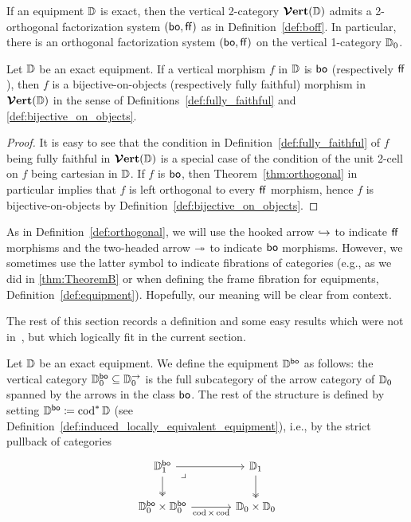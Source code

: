 \documentclass[11pt,oneside,article]{memoir}
\begin{document}
\begin{theorem}
      \label{thm:orthogonal}
   If an equipment $\mathbb{D}$ is exact, then the vertical 2-category $\bm{\mathcal{V}}\mathbf{ert}(\mathbb{D})$ admits a
   2-orthogonal factorization system $(\mathsf{bo},\mathsf{ff})$ as in Definition~\ref{def:boff}. In particular,
   there is an orthogonal factorization system $(\mathsf{bo},\mathsf{ff})$ on the vertical 1-category $\mathbb{D}_0$.
\end{theorem}

\begin{lemma}
      \label{lem:(bo,ff)_really_is}
   Let $\mathbb{D}$ be an exact equipment. If a vertical morphism $f$ in $\mathbb{D}$ is $\mathsf{bo}$
   (respectively $\mathsf{ff}$), then $f$ is a bijective-on-objects (respectively fully faithful) morphism
   in $\bm{\mathcal{V}}\mathbf{ert}(\mathbb{D})$ in the sense of Definitions~\ref{def:fully_faithful} and
   \ref{def:bijective_on_objects}.
\end{lemma}
\begin{proof}
   It is easy to see that the condition in Definition~\ref{def:fully_faithful} of $f$ being
   fully faithful in $\bm{\mathcal{V}}\mathbf{ert}(\mathbb{D})$ is a special case of the condition of the unit 2-cell on $f$
   being cartesian in $\mathbb{D}$. If $f$ is $\mathsf{bo}$, then Theorem~\ref{thm:orthogonal} in particular
   implies that $f$ is left orthogonal to every $\mathsf{ff}$ morphism, hence $f$ is bijective-on-objects
   by Definition~\ref{def:bijective_on_objects}.
\end{proof}

\begin{remark}
   As in Definition~\ref{def:orthogonal}, we will use the hooked arrow $\hookrightarrow$ to indicate $\mathsf{ff}$
   morphisms and the two-headed arrow $\twoheadrightarrow$ to indicate $\mathsf{bo}$ morphisms. However, we sometimes use
   the latter symbol to indicate fibrations of categories (e.g., as we did in \ref{thm:TheoremB} or
   when defining the frame fibration for equipments, Definition~\ref{def:equipment}). Hopefully, our
   meaning will be clear from context.
\end{remark}

The rest of this section records a definition and some easy results which were not
in~\cite{Schultz2015}, but which logically fit in the current section.

\begin{definition}
   Let $\mathbb{D}$ be an exact equipment. We define the equipment $\mathbb{D}^{\mathsf{bo}}$ as follows: the
   vertical category $\mathbb{D}_0^{\mathsf{bo}}\subseteq\mathbb{D}_0^{\rightarrow}$ is the full subcategory of the arrow category of
   $\mathbb{D}_0$ spanned by the arrows in the class $\mathsf{bo}$. The rest of the structure is defined by
   setting $\mathbb{D}^{\mathsf{bo}}\coloneqq\operatorname{cod}^*\mathbb{D}$ (see
   Definition~\ref{def:induced_locally_equivalent_equipment}), i.e., by the strict pullback of categories
   \[ \begin{tikzcd}[column sep=large]
      \dcat{D}_1^{\bo} \ar[r] \ar[d, two heads] \ar[dr,phantom,"\lrcorner" very near start]
         & \dcat{D}_1 \ar[d, two heads] \\
      \dcat{D}_0^{\bo}\times\dcat{D}_0^{\bo} \ar[r,"\cod\times\cod"']
         & \dcat{D}_0\times\dcat{D}_0
   \end{tikzcd} \]
\end{definition}
\end{document}
